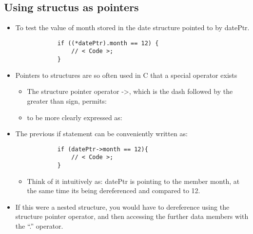 \subsection{Using structus as pointers}
\begin{itemize}
    \item To test the value of month stored in the date structure pointed to by datePtr.
        \begin{verbatim}
            if ((*datePtr).month == 12) {
                // < Code >;
            }
        \end{verbatim}
    
    \item Pointers to structures are so often used in C that a special operator exists
        \begin{itemize}
            \item The structure pointer operator ->, which is the dash followed by the greater than sign, permits:
            \item to be more clearly expressed as:
        \end{itemize}
    
    \item The previous if statement can be conveniently written as:
        \begin{verbatim}
            if (datePtr->month == 12){
                // < Code >;
            }
        \end{verbatim}
        \begin{itemize}
            \item Think of it intuitively as: datePtr is pointing to the member month, at the same time its being dereferenced and compared to 12.
        \end{itemize}
    
    \item If this were a nested structure, you would have to dereference using the structure pointer operator, and then accessing the further data members with the ``.'' operator.
\end{itemize}

